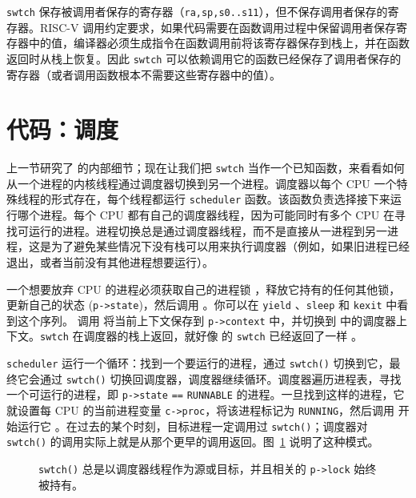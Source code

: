 \lstinline{swtch}
保存被调用者保存的寄存器（{\tt ra,sp,s0..s11}），但不保存调用者保存的寄存器。RISC-V 调用约定要求，如果代码需要在函数调用过程中保留调用者保存寄存器中的值，编译器必须生成指令在函数调用前将该寄存器保存到栈上，并在函数返回时从栈上恢复。因此 \lstinline{swtch} 可以依赖调用它的函数已经保存了调用者保存的寄存器（或者调用函数根本不需要这些寄存器中的值）。

\section{代码：调度}


上一节研究了  的内部细节；现在让我们把 \lstinline{swtch} 当作一个已知函数，来看看如何从一个进程的内核线程通过调度器切换到另一个进程。调度器以每个 CPU 一个特殊线程的形式存在，每个线程都运行 \lstinline{scheduler} 函数。该函数负责选择接下来运行哪个进程。每个 CPU 都有自己的调度器线程，因为可能同时有多个 CPU 在寻找可运行的进程。进程切换总是通过调度器线程，而不是直接从一进程到另一进程，这是为了避免某些情况下没有栈可以用来执行调度器（例如，如果旧进程已经退出，或者当前没有其他进程想要运行）。

一个想要放弃 CPU 的进程必须获取自己的进程锁 ，释放它持有的任何其他锁，更新自己的状态 (\lstinline{p->state})，然后调用 。你可以在 \lstinline{yield} 、\texttt{sleep} 和 \texttt{kexit} 中看到这个序列。 调用  将当前上下文保存到 \lstinline{p->context} 中，并切换到  中的调度器上下文。\lstinline{swtch} 在调度器的栈上返回，就好像  的 \lstinline{swtch} 已经返回了一样 。

\lstinline{scheduler}  运行一个循环：找到一个要运行的进程，通过 {\tt swtch()} 切换到它，最终它会通过 {\tt swtch()} 切换回调度器，调度器继续循环。调度器遍历进程表，寻找一个可运行的进程，即 \lstinline{p->state} \lstinline{==} \lstinline{RUNNABLE} 的进程。一旦找到这样的进程，它就设置每 CPU 的当前进程变量 \lstinline{c->proc}，将该进程标记为 \lstinline{RUNNING}，然后调用  开始运行它 。在过去的某个时刻，目标进程一定调用过 {\tt swtch()}；调度器对 {\tt swtch()} 的调用实际上就是从那个更早的调用返回。图~\ref{fig:inout} 说明了这种模式。

\begin{figure}[t]

\caption{{\tt swtch()} 总是以调度器线程作为源或目标，并且相关的 {\tt p->lock} 始终被持有。}
\label{fig:inout}
\end{figure}

